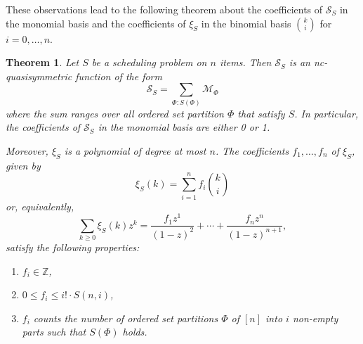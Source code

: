 \documentclass[12pt,reqno]{amsart}
\numberwithin{definition}{section}
\newtheorem{theorem}[definition]{Theorem}
\theoremstyle{definition}
\newcommand{\ZZ}{\mathbb{Z}}
\newcommand{\SSS}{\mathcal{S}}
\newcommand{\ehr}{\operatorname{ehr}}
\newcommand{\ncM}{\mathcal{M}}
\begin{document}
These observations lead to the following theorem about the coefficients of $\SSS_S$ in the monomial basis and the coefficients of $\xi_S$ in the binomial basis $\binom{k}{i}$ for $i=0,\ldots,n$.

\begin{theorem}
Let $S$ be a scheduling problem on $n$ items. Then $\SSS_S$ is an nc-quasisymmetric function of the form
\[
  \SSS_S = \sum_{\Phi:S(\Phi)} \ncM_\Phi
\]
where the sum ranges over all ordered set partition $\Phi$ that satisfy $S$. In particular, the coefficients of $\SSS_S$ in the monomial basis are either 0 or 1.

Moreover, $\xi_S$ is a polynomial of degree at most $n$. The coefficients $f_1,\ldots,f_n$ of $\xi_S$, given by
\[
  \xi_S(k) = \sum_{i=1}^n f_i\binom{k}{i}
\]
or, equivalently,
\[
  \sum_{k\geq 0} \xi_S(k)z^k = \frac{f_1z^1}{(1-z)^2} + \cdots + \frac{f_nz^{n}}{(1-z)^{n+1}},
\]
satisfy the following properties:
\begin{enumerate}
\item $f_i\in\ZZ$,
\item $0\leq f_i \leq i!\cdot S(n,i)$,
\item $f_i$ counts the number of ordered set partitions $\Phi$ of $[n]$ into $i$ non-empty parts such that $S(\Phi)$ holds.
\end{enumerate}
\end{theorem}
\end{document}
